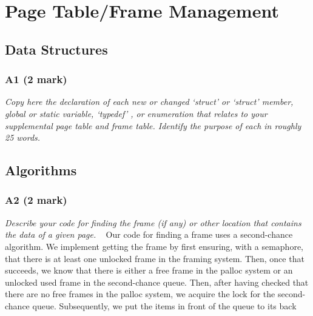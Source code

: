 \documentclass{report}
\newcommand{\question}[1]{\textit{#1} \ }
\newcommand{\file}[1]{\textcolor{YellowGreen}{\textbf{#1}}}
\newcommand{\pintoscode}[4]{}
\newcommand{\pintosfile}[3]{\pintoscode{#1}{#2}{\file{#3}}{#3}}
\begin{document}
	\section*{Page Table/Frame Management}
		\subsection*{Data Structures}
			\subsubsection*{A1 (2 mark)}
				\question{Copy here the declaration of each new or changed 
				`struct' or `struct' member, global or static variable, `typedef'
				, or enumeration that relates to your supplemental page table 
				and frame table. Identify the purpose of each in roughly 25 words.}
				
				\pintosfile{10}{22}{frame.c}
								
				\pintosfile{38}{38}{frame.c}
				
				
				
				
				\pintosfile{}{}{frame.c}
				
				

		\subsection*{Algorithms}
			\subsubsection*{A2 (2 mark)}
				\question{Describe your code for finding the frame (if any) or 
				other location that contains the data of a given page.}
				Our code for finding a frame uses a second-chance algorithm.
				We implement getting the frame by first ensuring, with a
				semaphore, that there is at least one unlocked frame in the framing
				system. Then, once that succeeds, we know that there is either
				a free frame in the palloc system or an unlocked used frame in
				the second-chance queue. Then, after having checked that there
				are no free frames in the palloc system, we acquire the lock
				for the second-chance queue. Subsequently, we put the items in
				front of the queue to its back 
	
\end{document}
